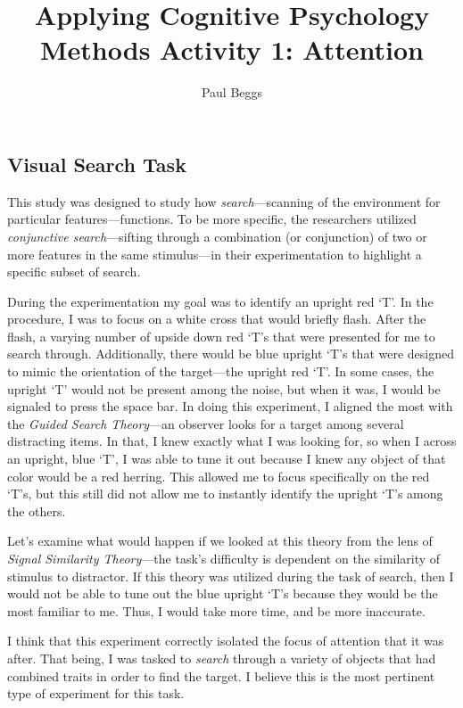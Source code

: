 \documentclass[stu,12pt,floatsintext]{apa7}
\title{Applying Cognitive Psychology Methods Activity 1: Attention} %
\author{Paul Beggs}
\affiliation{Department of Psychology, Hendrix College}
\begin{document}
\maketitle %

\subsection{Visual Search Task}

This study was designed to study how \textit{search}---scanning of the environment for particular features---functions. To be more specific, the researchers utilized \hypertarget{Conjunction}{\textit{conjunctive search}}---sifting through a combination (or conjunction) of two or more features in the same stimulus---in their experimentation to highlight a specific subset of search.

During the experimentation my goal was to identify an upright red `T'. In the procedure, I was to focus on a white cross that would briefly flash. After the flash, a varying number of upside down red `T's that were presented for me to search through. Additionally, there would be blue upright `T's that were designed to mimic the orientation of the target---the upright red `T'. In some cases, the upright `T' would not be present among the noise, but when it was, I would be signaled to press the space bar. In doing this experiment, I aligned the most with the \textit{Guided Search Theory}---an observer looks for a target among several distracting items. In that, I knew exactly what I was looking for, so when I across an upright, blue `T', I was able to tune it out because I knew any object of that color would be a red herring. This allowed me to focus specifically on the red `T's, but this still did not allow me to instantly identify the upright `T's among the others.

Let's examine what would happen if we looked at this theory from the lens of \textit{Signal Similarity Theory}---the task's difficulty is dependent on the similarity of stimulus to distractor. If this theory was utilized during the task of search, then I would not be able to tune out the blue upright `T's because they would be the most familiar to me. Thus, I would take more time, and be more inaccurate.

I think that this experiment correctly isolated the focus of attention that it was after. That being, I was tasked to \textit{search} through a variety of objects that had combined traits in order to find the target. I believe this is the most pertinent type of experiment for this task.
\end{document}
